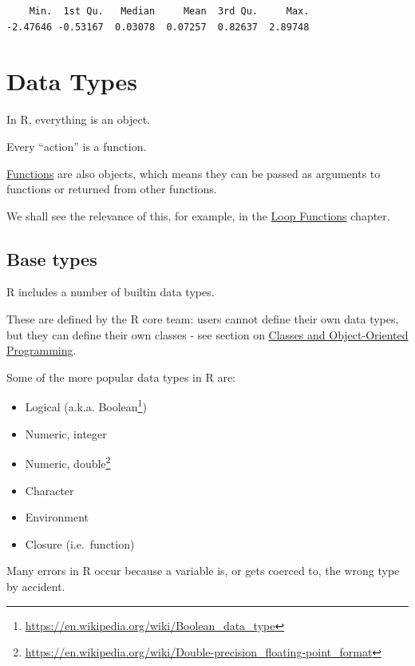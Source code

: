\documentclass[
]{book}
\makeatletter
\DeclareRobustCommand{\href}[2]{#2\footnote{\url{#1}}}
\providecommand{\tightlist}{%
  \setlength{\itemsep}{0pt}\setlength{\parskip}{0pt}}
\renewcommand{\href}[2]{#2\footnote{\url{#1}}}
\newenvironment{kframe}{%
\medskip{}
\setlength{\fboxsep}{.8em}
 \def\at@end@of@kframe{}%
 \ifinner\ifhmode%
  \def\at@end@of@kframe{\end{minipage}}%
  \begin{minipage}{\columnwidth}%
 \fi\fi%
 \def\FrameCommand##1{\hskip\@totalleftmargin \hskip-\fboxsep
 \colorbox{shadecolor}{##1}\hskip-\fboxsep
     \hskip-\linewidth \hskip-\@totalleftmargin \hskip\columnwidth}%
 \MakeFramed {\advance\hsize-\width
   \@totalleftmargin\z@ \linewidth\hsize
   \@setminipage}}%
 {\par\unskip\endMakeFramed%
 \at@end@of@kframe}
\newenvironment{rmdblock}[1]
  {
  \begin{itemize}
  \renewcommand{\labelitemi}{
    \raisebox{-.7\height}[0pt][0pt]{
      {\setkeys{Gin}{width=3em,keepaspectratio}\texttt{[image: images/\#1]}}
    }
  }
  \setlength{\fboxsep}{1em}
  \begin{kframe}
  \item
  }
  {
  \end{kframe}
  \end{itemize}
  }
\newenvironment{info}
  {\begin{rmdblock}{info}}
  {\end{rmdblock}}
\newenvironment{warning}
  {\begin{rmdblock}{warning}}
  {\end{rmdblock}}
\makeatother
\begin{document}
\begin{verbatim}
    Min.  1st Qu.   Median     Mean  3rd Qu.     Max. 
-2.47646 -0.53167  0.03078  0.07257  0.82637  2.89748 
\end{verbatim}

\hypertarget{types}{%
\chapter{Data Types}\label{types}}

\begin{info}
In R, everything is an object.

Every ``action'' is a function.

\protect\hyperlink{functions}{Functions} are also objects, which means
they can be passed as arguments to functions or returned from other
functions.

We shall see the relevance of this, for example, in the
\protect\hyperlink{loopfns}{Loop Functions} chapter.
\end{info}

\hypertarget{base-types}{%
\section{Base types}\label{base-types}}

R includes a number of builtin data types.

These are defined by the R core team: users cannot define their own data types, but they can define their own classes - see section on \protect\hyperlink{classes}{Classes and Object-Oriented Programming}.

Some of the more popular data types in R are:

\begin{itemize}
\tightlist
\item
  Logical (a.k.a. \href{https://en.wikipedia.org/wiki/Boolean_data_type}{Boolean})
\item
  Numeric, integer
\item
  Numeric, \href{https://en.wikipedia.org/wiki/Double-precision_floating-point_format}{double}
\item
  Character
\item
  Environment
\item
  Closure (i.e.~function)
\end{itemize}

\begin{warning}
Many errors in R occur because a variable is, or gets coerced to, the
wrong type by accident.
\end{warning}
\end{document}
